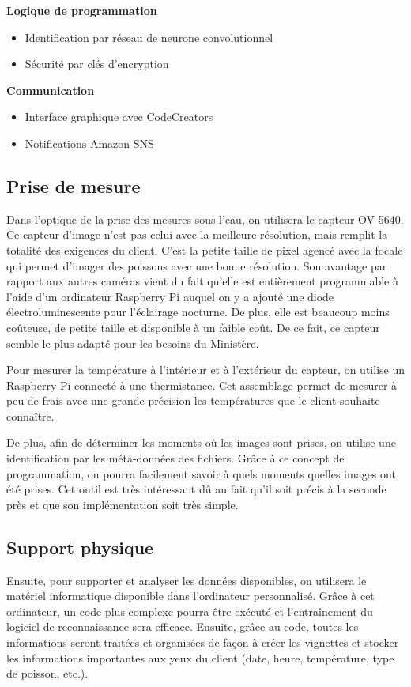 \textbf{Logique de programmation}
\begin{itemize}
    \item Identification par réseau de neurone convolutionnel
    \item Sécurité par clés d'encryption
\end{itemize}

\textbf{Communication}
\begin{itemize}
    \item Interface graphique avec CodeCreators
    \item Notifications Amazon SNS
\end{itemize}

\clearpage

\subsection{Prise de mesure}
Dans l'optique de la prise des mesures sous l'eau, on utilisera le capteur OV 5640. Ce capteur d'image n'est pas celui avec la meilleure résolution, mais remplit la totalité des exigences du client. C'est la petite taille de pixel agencé avec la focale qui permet d'imager des poissons avec une bonne résolution. Son avantage par rapport aux autres caméras vient du fait qu'elle est entièrement programmable à l'aide d'un ordinateur Raspberry Pi auquel on y a ajouté une diode électroluminescente pour l'éclairage nocturne. De plus, elle est beaucoup moins coûteuse, de petite taille et disponible à un faible coût. De ce fait, ce capteur semble le plus adapté pour les besoins du Ministère.

Pour mesurer la température à l'intérieur et à l'extérieur du capteur, on utilise un Raspberry Pi connecté à une thermistance. Cet assemblage permet de mesurer à peu de frais avec une grande précision les températures que le client souhaite connaître.

De plus, afin de déterminer les moments où les images sont prises, on utilise une identification par les méta-données des fichiers. Grâce à ce concept de programmation, on pourra facilement savoir à quels moments quelles images ont été prises. Cet outil est très intéressant dû au fait qu'il soit précis à la seconde près et que son implémentation soit très simple.

\subsection{Support physique}
Ensuite, pour supporter et analyser les données disponibles, on utilisera le matériel informatique disponible dans l'ordinateur personnalisé. Grâce à cet ordinateur, un code plus complexe pourra être exécuté et l'entraînement du logiciel de reconnaissance sera efficace. Ensuite, grâce au code, toutes les informations seront traitées et organisées de façon à créer les vignettes et stocker les informations importantes aux yeux du client (date, heure, température, type de poisson, etc.).


